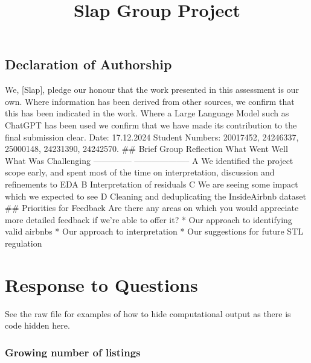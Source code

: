 \documentclass[
  a4paper,
  DIV=11,
  numbers=noendperiod]{scrartcl}
\title{Slap Group Project}
\author{}
\date{}
\begin{document}
\maketitle


\subsection*{Declaration of Authorship}\label{declaration-of-authorship}

We, {[}Slap{]}, pledge our honour that the work presented in this
assessment is our own. Where information has been derived from other
sources, we confirm that this has been indicated in the work. Where a
Large Language Model such as ChatGPT has been used we confirm that we
have made its contribution to the final submission clear. Date:
17.12.2024 Student Numbers: 20017452, 24246337, 25000148, 24231390,
24242570. \#\# Brief Group Reflection \textbar{} What Went Well
\textbar{} What Was Challenging \textbar{} \textbar{} --------------
\textbar{} -------------------- \textbar{} \textbar{} A We identified
the project scope early, and spent most of the time on interpretation,
discussion and refinements to EDA \textbar{} B Interpretation of
residuals \textbar{} \textbar{} C We are seeing some impact which we
expected to see \textbar{} D Cleaning and deduplicating the InsideAirbnb
dataset \textbar{} \#\# Priorities for Feedback Are there any areas on
which you would appreciate more detailed feedback if we're able to offer
it? * Our approach to identifying valid airbnbs * Our approach to
interpretation * Our suggestions for future STL regulation

\newpage{}

\section{Response to Questions}\label{response-to-questions}

See the raw file for examples of how to hide computational output as
there is code hidden here.

\subsubsection{Growing number of
listings}\label{growing-number-of-listings}
\end{document}
